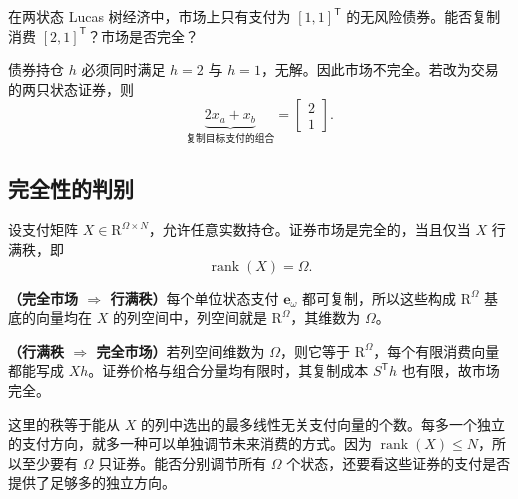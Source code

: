 \begin{tcolorbox}[example]
\begin{question}
在两状态 Lucas 树经济中，市场上只有支付为 $[1,1]^{\mathsf T}$ 的无风险债券。能否复制消费 $[2,1]^{\mathsf T}$？市场是否完全？
\end{question}
\begin{solution}
债券持仓 $h$ 必须同时满足 $h=2$ 与 $h=1$，无解。因此市场不完全。若改为交易 的两只状态证券，则
\[
 \underbrace{2x_a+x_b}_{\text{复制目标支付的组合}}
 =\begin{bmatrix}2\\1\end{bmatrix}.
\]
\end{solution}
\end{tcolorbox}

\subsection{完全性的判别}
\label{sec:wj-three-rank}
\begin{tcolorbox}[knowledge,title=完全市场的行满秩判据]
设支付矩阵 $X\in\mathrm R^{\Omega\times N}$，允许任意实数持仓。证券市场是完全的，当且仅当 $X$ 行满秩，即
\[
 \operatorname{rank}(X)=\Omega.
\]
\end{tcolorbox}

\textbf{（完全市场 $\Rightarrow$ 行满秩）}每个单位状态支付 $\mathbf e_\omega$ 都可复制，所以这些构成 $\mathrm R^\Omega$ 基底的向量均在 $X$ 的列空间中，列空间就是 $\mathrm R^\Omega$，其维数为 $\Omega$。

\textbf{（行满秩 $\Rightarrow$ 完全市场）}若列空间维数为 $\Omega$，则它等于 $\mathrm R^\Omega$，每个有限消费向量都能写成 $Xh$。证券价格与组合分量均有限时，其复制成本 $S^{\mathsf T}h$ 也有限，故市场完全。

这里的秩等于能从 $X$ 的列中选出的最多线性无关支付向量的个数。每多一个独立的支付方向，就多一种可以单独调节未来消费的方式。因为 $\operatorname{rank}(X)\le N$，所以至少要有 $\Omega$ 只证券。能否分别调节所有 $\Omega$ 个状态，还要看这些证券的支付是否提供了足够多的独立方向。

